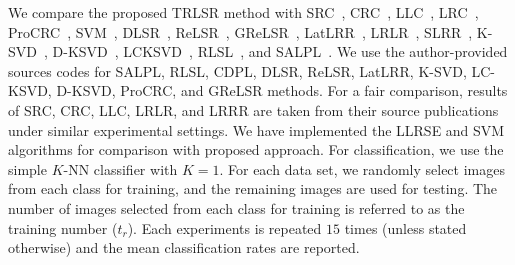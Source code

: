We compare the proposed TRLSR method with SRC~\cite{SRC}, CRC~\cite{CRC}, LLC~\cite{LLC}, LRC~\cite{LRC}, ProCRC~\cite{ProCRC}, SVM~\cite{SVM}, DLSR~\cite{DLSR}, ReLSR~\cite{ReLSR}, GReLSR~\cite{GReLSR}, LatLRR~\cite{LatLRR}, LRLR~\cite{LRLR_SLRR}, SLRR~\cite{LRLR_SLRR}, K-SVD~\cite{KSVD}, D-KSVD~\cite{DKSVD}, LCKSVD~\cite{LCKSVD}, RLSL~\cite{RLSL}, and SALPL~\cite{SALPL}. We use the author-provided sources codes for SALPL, RLSL, CDPL, DLSR, ReLSR, LatLRR, K-SVD, LC-KSVD, D-KSVD, ProCRC, and GReLSR methods. For a fair comparison, results of SRC, CRC, LLC, LRLR, and LRRR are taken from their source publications under similar experimental settings. We have implemented the LLRSE and SVM algorithms for comparison with proposed approach. For classification, we use the simple $K$-NN classifier with $K=1$. For each data set, we randomly select images from each class for training, and the remaining images are used for testing. The number of images selected from each class for training is referred to as the training number ($t_r$). Each experiments is repeated $15$ times (unless stated otherwise) and the mean classification rates are reported.
